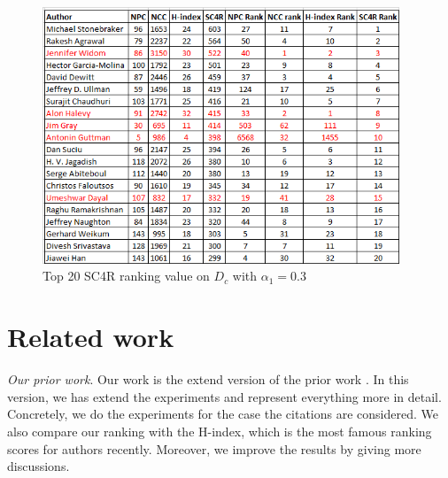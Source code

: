 \documentclass[10pt,leqno,twoside]{article}
\begin{document}
\begin{figure} %
	\caption{Top 20 SC4R ranking value on $D_c$ with $\alpha_1=0.3$}
	\label{Fig:Top20AuthorDetail}
    \centering
    \includegraphics[width=0.95\textwidth]{DCt20SC4Ra-f}
\end{figure}
%

\section{Related work}\label{Sect:Related}
\textit{Our prior work}. Our work is the extend version of the prior work \cite{Vu14}. In this version, we has extend the experiments and represent everything more in detail. Concretely, we do the experiments for the case the citations are considered. We also compare our ranking with the H-index, which is the most famous ranking scores for authors recently. Moreover, we improve the results by giving more discussions.
\end{document}
